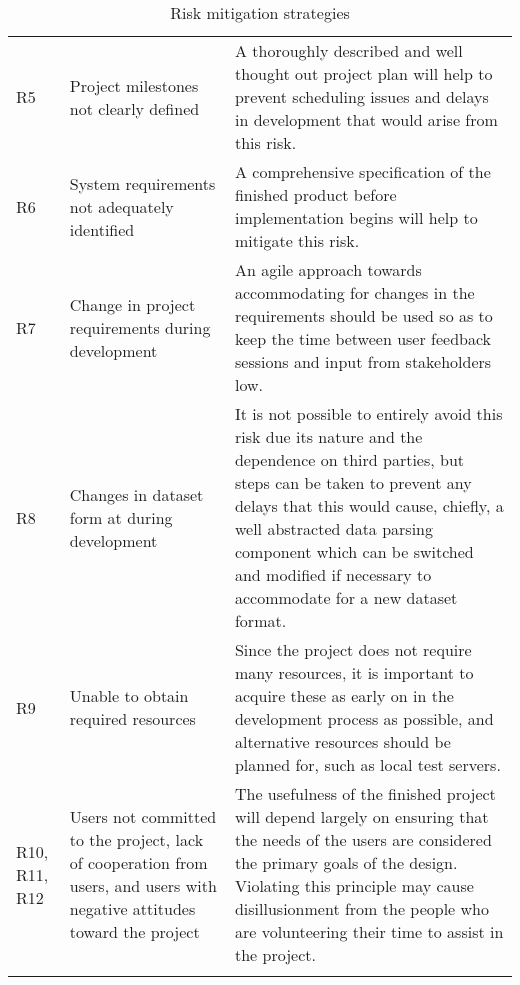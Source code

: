 \begin{longtable}{ | p{1cm} | p{6cm} | p{10.5cm} | }
R5 & Project milestones not clearly defined & A thoroughly described and well
thought out project plan will help to prevent scheduling issues and delays in
development that would arise from this risk.\\

R6 & System requirements not adequately identified & A comprehensive
specification of the finished product before implementation begins will help to
mitigate this risk.\\

R7 & Change in project requirements during development & An agile approach
towards accommodating for changes in the requirements should be used so as to
keep the time between user feedback sessions and input from stakeholders low.\\

R8 & Changes in dataset form at during development & It is not possible to
entirely avoid this risk due its nature and the dependence on third parties, but
steps can be taken to prevent any delays that this would cause, chiefly, a well
abstracted data parsing component which can be switched and modified if
necessary to accommodate for a new dataset format.\\

R9 & Unable to obtain required resources & Since the project does not require
many resources, it is important to acquire these as early on in the development
process as possible, and alternative resources should be planned for, such as
local test servers.\\

R10, R11, R12 & Users not committed to the project, lack of cooperation from
users, and users with negative attitudes toward the project & The usefulness of
the finished project will depend largely on ensuring that the needs of the users
are considered the primary goals of the design. Violating this principle may
cause disillusionment from the people who are volunteering their time to assist
in the project.\\

\hline
\caption{Risk mitigation strategies}
\label{tab:mitigation-strategies}
\end{longtable}
